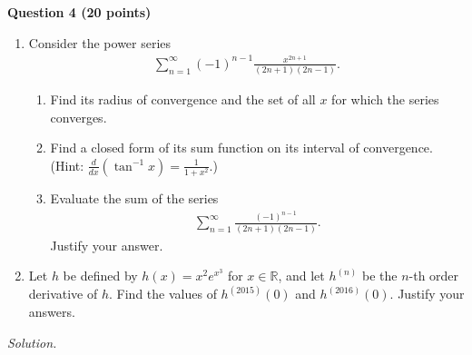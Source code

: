 \documentclass[11pt]{amsart}
\theoremstyle{plain}
\numberwithin{equation}{section}
\begin{document}
\noindent \textbf{Question 4 (20 points)}
\begin{enumerate}[label=\textbf{(\alph*)}]
    \itemsep 0em
    \item Consider the power series 
\begin{align*}
    \sum_{n=1}^{\infty}(-1)^{n-1}\frac{x^{2n+1}}{(2n+1)(2n-1)}.
\end{align*} 
\begin{enumerate}[label=\textbf{(\roman*)}]
        \itemsep 0em
        \item Find its radius of convergence and the set of all $x$ for which the series converges.
        \item Find a closed form of its sum function on its interval of convergence. 
        \newline (Hint: $\frac{d}{dx}\left(\tan^{-1}x\right)=\frac{1}{1+x^{2}}$.)
        \item Evaluate the sum of the series 
\begin{align*}
    \sum_{n=1}^{\infty}\frac{(-1)^{n-1}}{(2n+1)(2n-1)}.
\end{align*}
Justify your answer. 
    \end{enumerate}
    \item Let $h$ be defined by $h(x)=x^{2}e^{x^{3}}$ for $x\in\mathbb{R}$, and let $h^{(n)}$ be the $n$-th order derivative of $h$. Find the values of $h^{(2015)}(0)$ and $h^{(2016)}(0)$. Justify your answers.
\end{enumerate}
\noindent\emph{Solution.}
\end{document}
